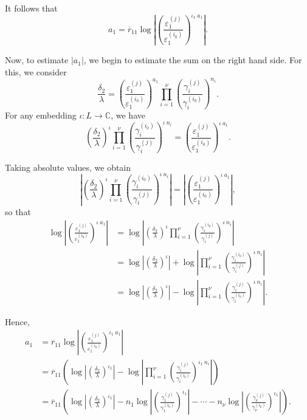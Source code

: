 It follows that 
\[a_1 =  \overline{r}_{11}\log\left|\left(\frac{\varepsilon_1^{(j)}}{\varepsilon_1^{(i_0)}}\right)^{\iota_1 \ 	a_1}\right|.\]

Now, to estimate $|a_1|$, we begin to estimate the sum on the right hand side. For this, we consider
\[\frac{\delta_2}{\lambda}= \left( \frac{\varepsilon_1^{(j)}}{\varepsilon_1^{(i_0)}}\right)^{a_1}\prod_{i = 1}^{\nu} \left( \frac{\gamma_i^{(j)}}{\gamma_i^{(i_0)}}\right)^{n_i}.\]
For any embedding $\iota: L \to \mathbb{C}$, we have 
\[\left(\frac{\delta_2}{\lambda}\right)^{\iota} \prod_{i = 1}^{\nu} \left( \frac{\gamma_i^{(i_0)}}{\gamma_i^{(j)}}\right)^{\iota \ n_i} =  \left( \frac{\varepsilon_1^{(j)}}{\varepsilon_1^{(i_0)}}\right)^{\iota \ a_1}.\] 

Taking absolute values, we obtain
\[\left|\left(\frac{\delta_2}{\lambda}\right)^{\iota} \prod_{i = 1}^{\nu} \left( \frac{\gamma_i^{(i_0)}}{\gamma_i^{(j)}}\right)^{\iota \ n_i}\right| = \left|\left( \frac{\varepsilon_1^{(j)}}{\varepsilon_1^{(i_0)}}\right)^{\iota \ a_1}\right|,\]
so that
\begin{align*}
\log\left|\left( \frac{\varepsilon_1^{(j)}}{\varepsilon_1^{(i_0)}}\right)^{\iota \ a_1}\right|
	& = \log\left|\left(\frac{\delta_2}{\lambda}\right)^{\iota} \prod_{i = 1}^{\nu} \left( \frac{\gamma_i^{(i_0)}}{\gamma_i^{(j)}}\right)^{\iota \ n_i}\right|\\
	& = \log\left|\left(\frac{\delta_2}{\lambda}\right)^{\iota}\right| + \log\left| \prod_{i = 1}^{\nu} \left( \frac{\gamma_i^{(i_0)}}{\gamma_i^{(j)}}\right)^{\iota \ n_i}\right|\\
	& = \log\left|\left(\frac{\delta_2}{\lambda}\right)^{\iota}\right| - \log\left| \prod_{i = 1}^{\nu} \left( \frac{\gamma_i^{(j)}}{\gamma_i^{(i_0)}}\right)^{\iota \ n_i}\right|. 
\end{align*}

Hence, 
\begin{align*}
a_1	& =  \overline{r}_{11}\log\left|\left(\frac{\varepsilon_1^{(j)}}{\varepsilon_1^{(i_0)}}\right)^{\iota_1 \ 	a_1}\right| \\
	& = \overline{r}_{11}\left( \log\left|\left(\frac{\delta_2}{\lambda}\right)^{\iota_1}\right| - \log\left| \prod_{i = 1}^{\nu} \left( \frac{\gamma_i^{(j)}}{\gamma_i^{(i_0)}}\right)^{\iota_1 \ n_i}\right|\right)\\
	& = \overline{r}_{11}\left(\log\left|\left(\frac{\delta_2}{\lambda}\right)^{\iota_1}\right| - 
	n_1\log\left| \left( \frac{\gamma_1^{(j)}}{\gamma_1^{(i_0)}}\right)^{\iota_1}\right| - \cdots -n_{\nu}\log \left|\left( \frac{\gamma_{\nu}^{(j)}}{\gamma_{\nu}^{(i_0)}}\right)^{\iota_1}\right|\right).
\end{align*}

